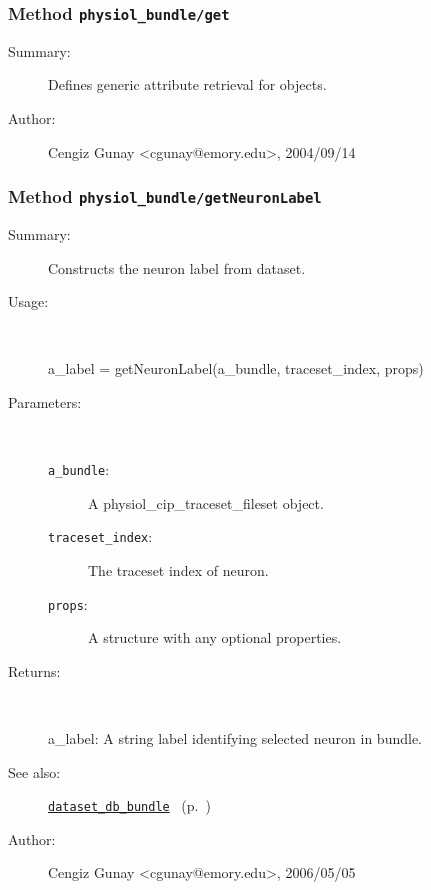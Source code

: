 \subsubsection[Method \texttt{get}]{Method \texttt{physiol\_bundle/get}}%
%
\label{ref_physiol_bundle__get}%
\hypertarget{ref_physiol_bundle__get}{}%
\begin{description}
\item[Summary:]Defines generic attribute retrieval for objects.
%
%
%
%
%
%
%
\item[Author:]%
Cengiz Gunay <cgunay@emory.edu>, 2004/09/14
%
\end{description}
\methodline%
\subsubsection[Method \texttt{getNeuronLabel}]{Method \texttt{physiol\_bundle/getNeuronLabel}}%
%
\label{ref_physiol_bundle__getNeuronLabel}%
\hypertarget{ref_physiol_bundle__getNeuronLabel}{}%
\begin{description}
\item[Summary:]Constructs the neuron label from dataset.
%
\item[Usage:]~%
\begin{lyxcode}%
a\_label = getNeuronLabel(a\_bundle, traceset\_index, props)
%
\end{lyxcode}%
%
%
\item[Parameters:]~
\begin{description}%
\item[\texttt{a\_bundle}:]
 A physiol\_cip\_traceset\_fileset object.
\item[\texttt{traceset\_index}:]
 The traceset index of neuron.
\item[\texttt{props}:]
 A structure with any optional properties.
\end{description}%
%
\item[Returns:
]~

	a\_label: A string label identifying selected neuron in bundle.
%
%
\item[See also:]%
\hyperlink{ref_dataset_db_bundle}{\texttt{dataset\_db\_bundle}}%
\ (p.~\pageref{ref_dataset_db_bundle})%
%
%
\item[Author:]%
Cengiz Gunay <cgunay@emory.edu>, 2006/05/05
%
\end{description}
\methodline%
